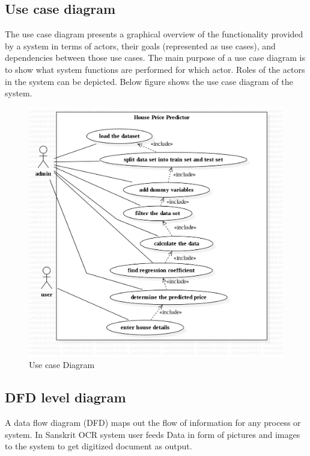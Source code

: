 \subsection{Use case diagram}
 The use case diagram presents a graphical overview of the functionality provided by a 
system in terms of actors, their goals (represented as use cases), and dependencies 
between those use cases. The main purpose of a use case diagram is to show what 
system functions are performed for which actor. Roles of the actors in the system can 
be depicted. Below figure shows the use case diagram of the system.
\newpage 
\begin{figure} 
	\includegraphics[width=6in]{UseCaseDiagram1.png} 
	\caption{Use case Diagram} %
\end{figure}
 \subsection{DFD level diagram}
A data flow diagram (DFD) maps out the flow of information for any process or system. In Sanskrit OCR system user feeds Data in form of pictures and images to the system to get digitized document as output. \\
